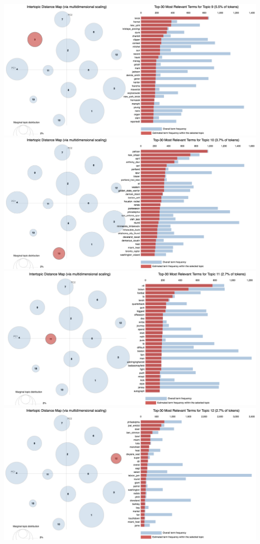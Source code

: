 \documentclass[11pt]{article}
\begin{document}
\includegraphics[width=400pt]{9.png} \\
\includegraphics[width=400pt]{10.png} \\
\includegraphics[width=400pt]{11.png} \\
\includegraphics[width=400pt]{12.png} \\
\end{document}
